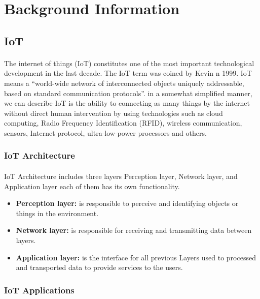 \documentclass[12pt, oneside, a4paper]{book}
\newcommand\boldcolor[1]{\textcolor{bold}{\textbf{#1}}}
\begin{document}
			\section{Background Information}
			\subsection{IoT}
			\paragraph{}The internet of things (IoT) constitutes one of the most important technological
			development in the last decade. The IoT term was coined by Kevin n 1999\cite{iot_1}. IoT
			means a “world-wide network of interconnected objects uniquely addressable, based
			on standard communication protocols”\cite{iot_2}. in a somewhat simplified manner, we
			can describe IoT is the ability to connecting as many things by the internet without
			direct human intervention by using technologies such as cloud computing, Radio
			Frequency Identification (RFID), wireless communication, sensors, Internet
			protocol, ultra-low-power processors and others\cite{iot_3}.
			\subsubsection{IoT Architecture}
			\paragraph{} IoT Architecture includes three layers Perception layer, Network layer, and
			Application layer each of them has its own functionality.
			\begin{itemize}
				\item \boldcolor{Perception layer:} is responsible to perceive and identifying objects or things in the
				environment.
				\item \boldcolor{Network layer:} is responsible for receiving and transmitting data between layers.
				\item \boldcolor{Application layer:} is the interface for all previous Layers used to processed and
				transported data to provide services to the users\cite{iot_4}.
			\end{itemize}
			\subsubsection{IoT Applications}
\end{document}
